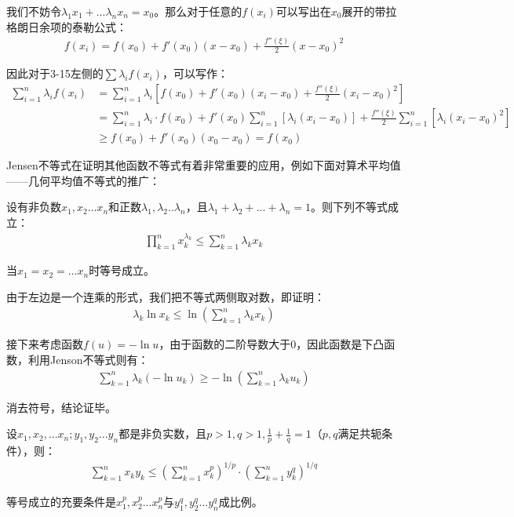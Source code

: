 \documentclass{ctexart}
\begin{document}
我们不妨令$\lambda_1x_1+...\lambda_nx_n=x_0$。那么对于任意的$f(x_i)$可以写出在$x_0$展开的带拉格朗日余项的泰勒公式：
\begin{align*}
    f(x_i)=f(x_0)+f'(x_0)(x-x_0)+\frac{f''(\xi)}{2}(x-x_0)^2
\end{align*}

因此对于3-15左侧的$\sum\lambda_if(x_i)$，可以写作：
\begin{align*}
\sum_{i=1}^n\lambda_if(x_i)&=\sum_{i=1}^n\lambda_i\left[f(x_0)+f'(x_0)(x_i-x_0)+\frac{f''(\xi)}{2}(x_i-x_0)^2 \right]\\
    &=\sum_{i=1}^n\lambda_i\cdot f(x_0)+f'(x_0)\sum_{i=1}^n\left[\lambda_i(x_i-x_0)\right]+\frac{f''(\xi)}{2}\sum_{i=1}^n\left[\lambda_i(x_i-x_0)^2\right]\\
 &\geq f(x_0)+f'(x_0)(x_0-x_0)=f(x_0)
\end{align*}

Jensen不等式在证明其他函数不等式有着非常重要的应用，例如下面对算术平均值——几何平均值不等式的推广：
\begin{tcolorbox}[
    colback=bac1,     %
    colframe=fra1,   %
    coltitle=white,             %
    coltext=tex1,
    title=算术平均值——几何平均值不等式的推广,
    fonttitle=\bfseries,        %
arc=3mm,                     %
breakable
]
设有非负数$x_1,x_2...x_n$和正数$\lambda_1,\lambda_2..\lambda_n$，且$\lambda_1+\lambda_2+...+\lambda_n=1$。则下列不等式成立：
\begin{align*}
    \prod_{k=1}^n x_k^{\lambda_k}\leq \sum_{k=1}^n\lambda_kx_k\tag{3-16}
\end{align*}

当$x_1=x_2=...x_n$时等号成立。
\end{tcolorbox}

由于左边是一个连乘的形式，我们把不等式两侧取对数，即证明：
\begin{align*}
 \lambda_k \ln x_k\leq \ln(\sum_{k=1}^n\lambda_kx_k)
\end{align*}

接下来考虑函数$f(u)=-\ln u$，由于函数的二阶导数大于0，因此函数是下凸函数，利用Jenson不等式则有：
\begin{align*}
    \sum_{k=1}^n\lambda_k(-\ln u_k)\geq -\ln (\sum_{k=1}^n \lambda_ku_k)
\end{align*}

消去符号，结论证毕。

\begin{tcolorbox}[
    colback=bac1,     %
    colframe=fra1,   %
    coltitle=white,             %
    coltext=tex1,
    title=H\"older 不等式,
    fonttitle=\bfseries,        %
arc=3mm,                     %
breakable
]
设$x_1,x_2,...x_n;y_1,y_2...y_n$都是非负实数，且$p>1,q>1,\frac{1}{p}+\frac{1}{q}=1$（$p,q$满足共轭条件），则：
\begin{align*}
    \sum_{k=1}^n x_ky_k\leq \left(\sum_{k=1}^n x_k^p\right)^{1/p}\cdot \left(\sum_{k=1}^n y_k^q\right)^{1/q}\tag{3-17}
\end{align*}

等号成立的充要条件是$x_1^p,x_2^p...x_n^p$与$y_1^q,y_2^q...y_n^q$成比例。
\end{tcolorbox}
\end{document}
